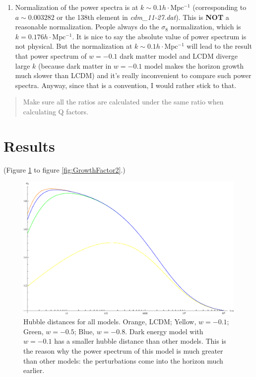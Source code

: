 \documentclass{article}
\begin{document}
\begin{enumerate}
\item
Normalization of the power spectra is at $k\sim 0.1 h\cdot \mathrm {Mpc^{-1}}$ (corresponding to $a\sim 0.003282$ or the 138th element in {\it cdm\_11-27.dat}). This is {\bf NOT} a reasonable normalization. People always do the $\sigma_8$ normalization, which is $k=0.176 h\cdot \mathrm{Mpc^{-1}}$.
It is nice to say the absolute value of power spectrum is not physical. But the normalization at $k\sim 0.1 h \cdot \mathrm {Mpc^{-1}}$ will lead to the result that power spectrum of $w=-0.1$ dark matter model and LCDM diverge large $k$ (because dark matter in $w=-0.1$ model makes the horizon growth much slower than LCDM) and it's really inconvenient to compare such power spectra. Anyway, since that is a convention, I would rather stick to that.



\end{enumerate}

\begin{quote}
{\color{red}Make sure all the ratios are calculated under the same ratio when calculating Q factors.}
\end{quote}




\section{Results}

(Figure \ref{fig:HubbleDistances-all} to figure  \ref{fig:GrowthFactor2}.)


\begin{figure}[!htbp]
\centering
\includegraphics[width=400pt]{DEs_Sync-HubbleDistances-all.eps}
\caption{Hubble distances for all models. Orange, LCDM; Yellow, $w=-0.1$; Green, $w=-0.5$; Blue, $w=-0.8$.
Dark energy model with $w=-0.1$ has a smaller hubble distance than other models. This is the reason why the power spectrum of this model is much greater than other models: the perturbations come into the horizon much earlier.}\label{fig:HubbleDistances-all}
\end{figure}
\end{document}
